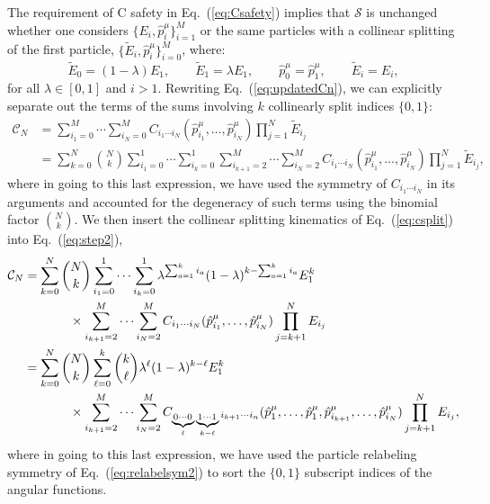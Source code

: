 \documentclass[letterpaper,11pt]{article}
\DeclareRobustCommand{\Eq}[1]{Eq.~(\ref{#1})}
\begin{document}
The requirement of C safety in \Eq{eq:Csafety} implies that $\mathcal S$ is unchanged whether one considers $\{E_i,\hat p_i^\mu\}_{i=1}^M$ or the same particles with a collinear splitting of the first particle, $\{\tilde E_i, \hat p_i^\mu\}_{i=0}^M$, where:
\begin{equation}
\label{eq:csplit}
\tilde E_0=(1- \lambda) E_1,\qquad \tilde E_1 = \lambda E_1,\qquad \hat p_0^\mu=\hat p_1^\mu,\qquad \tilde E_i = E_i,
\end{equation}
for all $\lambda\in[0,1]$ and $i>1$.  Rewriting \Eq{eq:updatedCn}, we can explicitly separate out the terms of the sums involving $k$ collinearly split indices $\{0,1\}$:
\begin{align}
\mathcal C_N&=\sum_{i_1=0}^M\cdots\sum_{i_N=0}^MC_{i_1\cdots i_N}(\hat p_{i_1}^\mu,\ldots,\hat p_{i_N}^\mu)\prod_{j=1}^N\tilde E_{i_j}\label{eq:step1}\\
&=\sum_{k=0}^N\binom{N}{k}\sum_{i_1=0}^1\cdots\sum_{i_k=0}^1\sum_{i_{k+1}=2}^M\cdots\sum_{i_N=2}^MC_{i_1\cdots i_N}(\hat p_{i_1}^\mu,\ldots,\hat p_{i_N}^\mu)\prod_{j=1}^N\tilde E_{i_j}, \label{eq:step2}
\end{align}
where in going to this last expression, we have used the symmetry of $C_{i_1\cdots i_N}$ in its arguments and accounted for the degeneracy of such terms using the binomial factor $\binom{N}{k}$.
%
We then insert the collinear splitting kinematics of \Eq{eq:csplit} into \Eq{eq:step2},
\begin{align}
\mathcal C_N&=\sum_{k=0}^N\binom{N}{k}\sum_{i_1=0}^1\cdots\sum_{i_k=0}^1\lambda^{\sum_{a=1}^ki_a}(1-\lambda)^{k-\sum_{a=1}^ki_a}E_1^k\label{eq:step3}\\
&\hspace{.5in}\times\sum_{i_{k+1}=2}^M\cdots\sum_{i_N=2}^MC_{i_1\cdots i_N}(\hat p_{i_1}^\mu,\ldots,\hat p_{i_N}^\mu)\prod_{j=k+1}^N E_{i_j} \nonumber\\
&=\sum_{k=0}^N\binom{N}{k}\sum_{\ell=0}^k\binom{k}{\ell}\lambda^\ell(1-\lambda)^{k-\ell}E_1^k\label{eq:collinear}\\
&\hspace{.5in}\times\sum_{i_{k+1}=2}^M\cdots\sum_{i_N=2}^M C_{\underbrace{{}_{0\cdots0}}_{\ell}\underbrace{{}_{1\cdots1}}_{k-\ell}i_{k+1}\cdots i_n}(\hat p_{1}^\mu,\ldots,\hat p_{1}^\mu,\hat p_{i_{k+1}}^\mu,\ldots,\hat p_{i_N}^\mu)\prod_{j=k+1}^N E_{i_j},\nonumber
\end{align}
where in going to this last expression, we have used the particle relabeling symmetry of \Eq{eq:relabelsym2} to sort the $\{0,1\}$ subscript indices of the angular functions.
\end{document}
